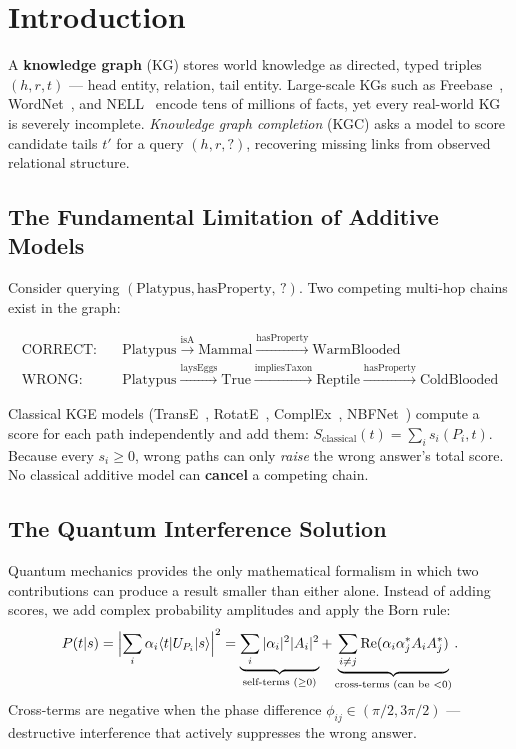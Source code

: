 \documentclass[runningheads]{llncs}
\newcommand{\braket}[2]{\langle#1|#2\rangle}
\begin{document}
\section{Introduction}
\label{sec:intro}

A \textbf{knowledge graph} (KG) stores world knowledge as directed, typed
triples $(h, r, t)$ --- head entity, relation, tail entity.
Large-scale KGs such as Freebase~\cite{ref_freebase},
WordNet~\cite{ref_wordnet}, and NELL~\cite{ref_nell} encode tens of millions
of facts, yet every real-world KG is severely incomplete.
\textit{Knowledge graph completion} (KGC) asks a model to score candidate
tails $t'$ for a query $(h, r, ?)$, recovering missing links from observed
relational structure.

\subsection{The Fundamental Limitation of Additive Models}

Consider querying $(\text{Platypus}, \text{hasProperty},\,?)$.  Two competing
multi-hop chains exist in the graph:

\begin{align*}
  \text{CORRECT:} &\quad
    \text{Platypus}\xrightarrow{\text{isA}}\text{Mammal}
    \xrightarrow{\text{hasProperty}}\text{WarmBlooded} \\
  \text{WRONG:}   &\quad
    \text{Platypus}\xrightarrow{\text{laysEggs}}\text{True}
    \xrightarrow{\text{impliesTaxon}}\text{Reptile}
    \xrightarrow{\text{hasProperty}}\text{ColdBlooded}
\end{align*}

Classical KGE models (TransE~\cite{ref_transe}, RotatE~\cite{ref_rotate},
ComplEx~\cite{ref_complex}, NBFNet~\cite{ref_nbfnet}) compute a score for
each path independently and add them:
$S_\text{classical}(t)=\sum_i s_i(P_i,t)$.
Because every $s_i\geq 0$, wrong paths can only \emph{raise} the wrong
answer's total score.  No classical additive model can \textbf{cancel} a
competing chain.

\subsection{The Quantum Interference Solution}

Quantum mechanics provides the only mathematical formalism in which two
contributions can produce a result smaller than either alone.  Instead of
adding scores, we add complex probability amplitudes and apply the Born rule:
\[
  P(t|s) = \Bigl|\sum_i \alpha_i \braket{t}{U_{P_i}|s}\Bigr|^2
  = \underbrace{\sum_i |\alpha_i|^2|A_i|^2}_{\text{self-terms }(\geq 0)}
  + \underbrace{\sum_{i\neq j}\operatorname{Re}(\alpha_i\alpha_j^*A_iA_j^*)}_{\text{cross-terms (can be }<0)}.
\]
Cross-terms are negative when the phase difference $\phi_{ij}\in(\pi/2,3\pi/2)$
--- destructive interference that actively suppresses the wrong answer.
\end{document}
